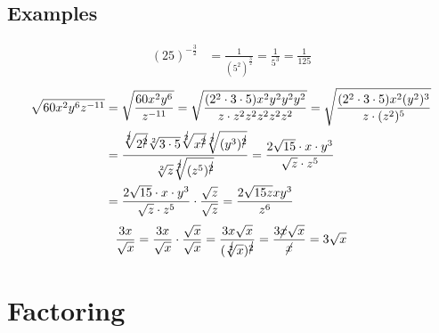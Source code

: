 \documentclass{article}
\begin{document}
    \subsection{Examples}
    \begin{align*}
        (25)^{-\frac{3}{2}} 
        &= \frac{1}{(5^2)^{\frac{3}{2}}}
        = \frac{1}{5^3}
        = \frac{1}{125}
    \end{align*}
    \begin{align*}
        \sqrt{60x^2y^6z^{-11}}
        &= \sqrt{\frac{60x^2y^6}{z^{-11}}}
        = \sqrt{\frac{(2^2 \cdot 3 \cdot 5)x^2y^2y^2y^2}{z \cdot z^2z^2z^2z^2z^2}}
        = \sqrt{\frac{(2^2 \cdot 3 \cdot 5)x^2(y^2)^3}{z \cdot (z^2)^5}} \\
        &= \frac{\sqrt[\cancel{2}]{2^{\cancel{2}}}\sqrt[2]{3 \cdot 5}\sqrt[\cancel{2}]{x^{\cancel{2}}}\sqrt[\cancel{2}]{(y^3)^{\cancel{2}}}}{\sqrt[2]{z}\sqrt[\cancel{2}]{(z^5)^{\cancel{2}}}}
        = \frac{2\sqrt{15} \cdot x \cdot y^3}{\sqrt{z} \cdot z^5}\\
        &= \frac{2\sqrt{15} \cdot x \cdot y^3}{\sqrt{z} \cdot z^5} \cdot \frac{\sqrt{z}}{\sqrt{z}}
        = \frac{2\sqrt{15z}xy^3}{z^6}
    \end{align*}
    \begin{align*}
        \frac{3x}{\sqrt{x}} 
        = \frac{3x}{\sqrt{x}} \cdot \frac{\sqrt{x}}{\sqrt{x}} 
        = \frac{3x\sqrt{x}}{(\sqrt[\cancel{2}]{x})^{\cancel{2}}}
        = \frac{3\cancel{x}\sqrt{x}}{\cancel{x}}
        = 3\sqrt{x}
    \end{align*}
    
    \section{Factoring}
\end{document}
